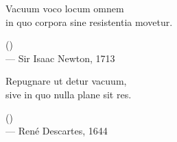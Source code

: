 \begin{flushright}
\itshape
\begin{hangleftquote}{\QGROpen}{\QGRClose}
Vacuum voco locum omnem\\
in quo corpora sine resistentia movetur.
\end{hangleftquote}
\par\smallskip
\normalfont () \\
— Sir Isaac Newton, 1713
\end{flushright}

\vspace{2em}

\begin{flushright}
\itshape
\begin{hangleftquote}{\QGROpen}{\QGRClose}
Repugnare ut detur vacuum,\\
sive in quo nulla plane sit res.
\end{hangleftquote}
\par\smallskip
\normalfont () \\
— René Descartes, 1644
\end{flushright}
